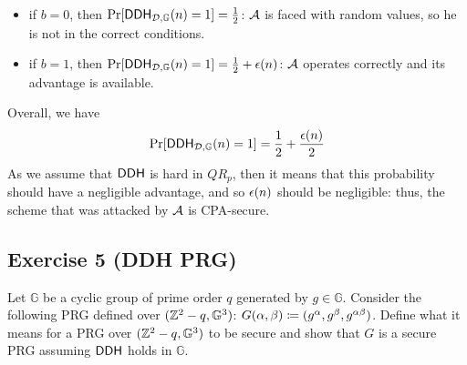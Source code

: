 \begin{solution}
\begin{enumerate}
		\begin{itemize}
			\item if $b = 0$, then $\Pr[\mathsf{DDH}_{\mathcal{D}, \mathbb{G}}(n)=1] = \frac{1}{2}$: $\mathcal{A}$ is faced with random values, so he is not in the correct conditions.
			\item if $b = 1$, then $\Pr[\mathsf{DDH}_{\mathcal{D}, \mathbb{G}}(n)=1] = \frac{1}{2} + \epsilon(n)$: $\mathcal{A}$ operates correctly and its advantage is available.
		\end{itemize}
		Overall, we have
		\[ \Pr[\mathsf{DDH}_{\mathcal{D}, \mathbb{G}}(n)=1] = \frac12 + \frac{\epsilon(n)}{2} \]
		As we assume that $\mathsf{DDH}$ is hard in $QR_p$, then it means that this probability should have a negligible advantage, and so $\epsilon(n)$ should be negligible: thus, the scheme that was attacked by $\mathcal{A}$ is CPA-secure.
	\end{enumerate}
\end{solution}



\subsection{Exercise 5 (DDH PRG)}

Let $\mathbb{G}$ be a cyclic group of prime order $q$ generated by $g \in \mathbb{G}$.
Consider the following PRG defined over $(\mathbb{Z}^2-q, \mathbb{G}^3)$:
$G(\alpha, \beta) \coloneqq (g^\alpha, g^\beta, g^{\alpha\beta})$.
Define what it means for a PRG over $(\mathbb{Z}^2-q, \mathbb{G}^3)$ to be secure and show that $G$ is a secure PRG assuming $\mathsf{DDH}$ holds in $\mathbb{G}$.


